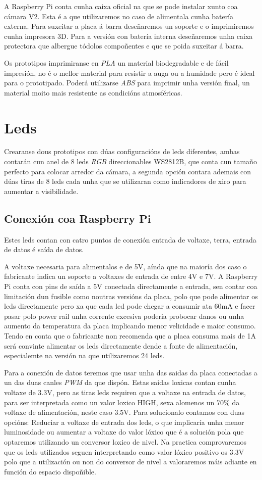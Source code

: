 A Raspberry Pi conta cunha caixa oficial na que se pode instalar xunto coa cámara V2. Esta é a que utilizaremos no caso de alimentala cunha batería externa. Para suxeitar a placa á barra deseñaremos un soporte e o imprimiremos cunha impresora 3D. Para a versión con batería interna deseñaremos unha caixa protectora que albergue tódolos compoñentes e que se poida suxeitar á barra.

Os prototipos imprimiranse en \emph{PLA} un material biodegradable e de fácil impresión, no é o mellor material para resistir a auga ou a humidade pero é ideal para o prototipado. Poderá utilizarse \emph{ABS} para imprimir unha versión final, un material moito mais resistente as condicións atmosféricas.

\section{Leds}

Crearanse dous prototipos con dúas configuracións de leds diferentes, ambas contarán cun anel de 8 leds \emph{RGB} direccionables WS2812B, que conta cun tamaño perfecto para colocar arredor da cámara, a segunda opción contara ademais con dúas tiras de 8 leds cada unha que se utilizaran como indicadores de xiro para aumentar a visibilidade.
\subsection{Conexión coa Raspberry Pi}
Estes leds contan con catro puntos de conexión entrada de voltaxe, terra, entrada de datos é saída de datos.

A voltaxe necesaria para alimentalos e de 5V, aínda que na maioría dos caso o fabricante indica un soporte a voltaxes de entrada de entre 4V e 7V. A Raspberry Pi conta con pins de saída a 5V conectada directamente a entrada, sen contar coa limitación dun fusible como noutras versións da placa, polo que pode alimentar os leds directamente pero xa que cada led pode chegar a consumir ata 60mA  e facer pasar polo power rail unha corrente excesiva poderia probocar danos ou unha aumento da temperatura da placa implicando menor velicidade e maior consumo. Tendo en conta que o fabricante non recomenda que a placa consuma mais de 1A será convinte alimentar os leds directamente dende a fonte de alimentación, especialemte na versión na que utilizaremos 24 leds.

Para a conexión de datos teremos que usar unha das saidas da placa conectadas a un das duas canles \emph{PWM} da que dispón. Estas saidas loxicas contan cunha voltaxe de 3.3V, pero as tiras leds requiren que a voltaxe na entrada de datos, para ser interpretada como un valor loxico HIGH, sexa alomenos un 70\(\%\) da  voltaxe de alimentación, neste caso 3.5V. Para solucionalo contamos con duas opcións: Reduciar a voltaxe de entrada dos leds, o que implicaría unha menor luminosidade ou aumentar a voltaxe do valor lóxico que é a solución pola que optaremos utilizando un conversor loxico de nivel. Na practica comprovaremos que os leds utilizados seguen interpretando como valor lóxico positivo os 3.3V polo que a utilización ou non do conversor de nivel a valoraremos máis adiante en función do espacio dispoñible.

